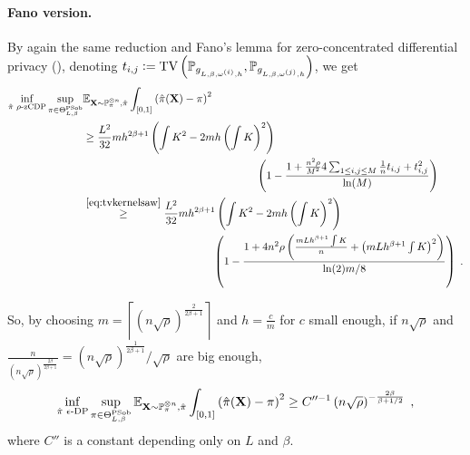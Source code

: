 \documentclass[10pt]{article} %
\newcommand{\Prob}[0]{\mathbb{P}}
\newcommand{\E}[0]{\mathbb{E}}
\newcommand{\eqdef}{\vcentcolon=}
\newcommand\vect[1]{\mathbf{#1}}
\newcommand\tv[2]{\mathrm{TV}\left( {#1}, {#2} \right)}
\newcommand\p[1]{\left( {#1}\right)}
\newcommand\ceil[1]{\left\lceil {#1}\right\rceil}
\newcommand\RG[1]{\textcolor{red}{#1}}
\newcommand\CL[1]{\textcolor{blue}{#1}}
\begin{document}
\paragraph{Fano version.}
By again the same reduction and Fano's lemma for zero-concentrated differential privacy (), denoting $t_{i, j} \eqdef \tv{\Prob_{g_{L, \beta, \omega^{(i)}, h}}}{\Prob_{g_{L, \beta,\omega^{(j)}, h}}}$, we get
\begin{equation*}
    \begin{aligned}
    \inf_{\hat{\pi} \text{ $\rho$-zCDP}} \sup_{\pi \in  \Theta^{\text{PSob}}_{L, \beta}}
    &\E_{\vect{X} \sim \Prob_{\pi}^{\otimes n}, \hat{\pi}} \int_{[0, 1]}\p{\hat{\pi}(\vect{X})- \pi}^2 \\
    &\geq 
     \frac{L^2}{32}  m h^{2 \beta + 1} \p{  \int K^2 - 2m h \p{\int K}^2} \\
     &\quad\quad\quad\quad\quad\quad\quad\quad\quad\quad\quad\quad\quad\quad\quad\quad
    \p{1 - \frac{1 + \frac{n^2 \rho}{M^2} 4 \sum_{1\leq i, j \leq M} \frac{1}{n} t_{i, j} + t_{i, j}^2}{\ln (M)}}  \\
    &\stackrel{\eqref{eq:tvkernelsaw}}{\geq}
    \frac{L^2}{32}  m h^{2 \beta + 1}  \p{ \int K^2 - 2m h \p{\int K}^2} \\
    &\quad\quad\quad\quad\quad\quad\quad\quad\quad\quad\quad\quad
    \p{1 - \frac{1 + 4 n^2 \rho \p{\frac{m L h^{\beta+1} \int K}{n} +\p{m L h^{\beta+1} \int K}^2}}{\ln (2) m / 8}} 
     \;.
    \end{aligned}
\end{equation*}

So, by choosing $m =  \ceil{\p{n \sqrt{\rho}}^{\frac{2}{2 \beta + 1}}}$ and $h = \frac{c}{m}$ for $c$ small enough, if 
$n \sqrt{\rho}$ and
$\frac{n}{\p{n \sqrt{\rho}}^{\frac{2 \beta}{2 \beta + 1}}} = \p{n\sqrt{\rho}}^{\frac{1}{2\beta+1}}/\sqrt{\rho}$
are big enough,
\begin{equation*}
    \begin{aligned}
    \inf_{\hat{\pi} \text{ $\epsilon$-DP}} \sup_{\pi \in \Theta^{\text{PSob}}_{L, \beta}}
    \E_{\vect{X} \sim \Prob_{\pi}^{\otimes n}, \hat{\pi}} \int_{[0, 1]}\p{\hat{\pi}(\vect{X})- \pi}^2
    \geq 
     C''^{-1} \p{n \sqrt{\rho}}^{-\frac{
    2\beta}{\beta + 1/2}} \;,
    \end{aligned}
\end{equation*}
where $C''$ is a constant depending only on $L$ and $\beta$.
\end{document}
